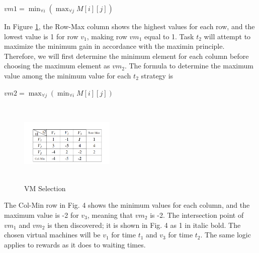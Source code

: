 \documentclass[conference]{IEEEtran}
\begin{document}
\begin{center}
$vm1 = \min_{\forall i} \left( \max_{\forall j} M[i][j] \right)$
\end{center}

In Figure \ref{Fig 5}, the Row-Max column shows the highest values for each row, and the lowest value is 1 for row $v_{1}$, making row $vm_{1}$ equal to 1.
Task $t_{2}$ will attempt to maximize the minimum gain in accordance with the maximin principle. Therefore, we will first determine the minimum element for each column before choosing the maximum element as $vm_{2}$. The formula to determine the maximum value among the minimum value for each $t_{2}$ strategy is
\begin{center}
    $vm2 = \max_{\forall j} \left( \min_{\forall i} M[i][j] \right)$
\end{center}
\begin{figure}[h]
  \centering
  \includegraphics[width=0.4\textwidth, height=4cm]{Figures/Fig 4.png}
  \caption{VM Selection \cite{patra2019game}}
  \label{Fig 5}
\end{figure}
The Col-Min row in Fig. 4 shows the minimum values for each column, and the maximum value is -2 for $v_{3}$, meaning that $vm_{2}$ is -2.
The intersection point of $vm_{1}$ and $vm_{2}$ is then discovered; it is shown in Fig. 4 as 1 in italic bold. The chosen virtual machines will be $v_{1}$ for time $t_{1}$ and $v_{3}$ for time $t_{2}$. The same logic applies to rewards as it does to waiting times.
\end{document}
